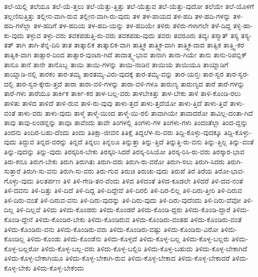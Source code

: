 {ತಲೆ-ಯಲ್ಲಿ
ತಲೆಯೂ
ತಲೆ-ಯೆ-ತ್ತಲು
ತಲೆ-ಯೆತ್ತು-ತ್ತಿತ್ತು
ತಲೆ-ಯೆತ್ತುವ
ತಲೆ-ಯೆತ್ತು-ವುದೋ
ತಲೆಯೇ
ತಲೆ-ಯೊಳಗೆ
ತಲ್ಲಣಿಸುತ್ತಿತ್ತು
ತಲ್ಲೀನ-ವಾಗಿ-ರುವ
ತಲ್ಲೀನ-ವಾಗಿ-ರು-ವುದು
ತಳ
ತಳ-ಪಾಯದ
ತಳ-ಹದಿ
ತಳ-ಹದಿ-ಗಳನ್ನು
ತಳ-ಹದಿ-ಗಳೆಲ್ಲಾ
ತಳ-ಹದಿಗೆ
ತಳ-ಹದಿಯ
ತಳ-ಹದಿ-ಯನ್ನು
ತಳ-ಹದಿಯೇ
ತಳಿರು
ತಳಿರು-ಗಳಾಗಲೇ
ತಳೆ-ದಿದ್ದ
ತಳ್ಳಿ-ಹಾ-ಕು-ವುದು
ತಳ್ಳುವ
ತಳ್ಳು-ವರು
ತವಕಪಡುತ್ತಿ-ರು-ವರು
ತವಕಪಡು-ವುದು
ತವರು
ತವರೂರು
ತವ್ಯಃ
ತಸ್ಮಾತ್
ತಸ್ಯ
ತಸ್ಯ-ತತ್
ತಾಗಿ
ತಾಗಿ-ತೆನ್ನ-ದಿರಿ
ತಾತ
ತಾತ್ಕಾಲಿಕ
ತಾತ್ಕಾಲಿಕ-ವಾಗಿ
ತಾತ್ತ್ವಿಕ
ತಾತ್ತ್ವಿಕ-ವಾಗಿ
ತಾತ್ತ್ವಿಕ-ವಾದ
ತಾತ್ವಿಕ
ತಾತ್ತ್ವಿ-ಕರ
ತಾತ್ವಿಕ-ವಾಗಿ
ತಾತ್ಸಾರ-ದಿಂದ
ತಾತ್ಸಾರ-ವುಂಟಾ-ಗಿದೆ
ತಾದಾತ್ಮ್ಯ-ಭಾವ
ತಾನಾಗಿ
ತಾನಾ-ಗಿಯೇ
ತಾನು
ತಾನು-ರಿಪಬ್ಲಿಕ್
ತಾನೂ
ತಾನೆ
ತಾನೇ
ತಾನೊಬ್ಬ
ತಾಯಿ
ತಾಯಿ-ಗಳನ್ನು
ತಾಯಿ-ನಾಡಿನ
ತಾಯಿಯ
ತಾಯಿಯೂ
ತಾಯ್ನಾಡಿಗೆ
ತಾಯ್ನಾಡಿ-ನಲ್ಲಿ
ತಾರಕಂ
ತಾರ-ತಮ್ಯ
ತಾರತಮ್ಯ-ವಿರು-ವುದಕ್ಕೆ
ತಾರ-ತಮ್ಯ-ವನ್ನು
ತಾರ-ಯನ್ತಃ
ತಾರ-ಸ್ವರ
ತಾರ-ಸ್ವರ-ದಲ್ಲಿ
ತಾರ-ಸ್ವರ-ಕ್ಕೇರು-ತ್ತದೆ
ತಾರಾ
ತಾರಾ-ವಳಿ-ಗಳನ್ನು
ತಾರಾ-ವಳಿ-ಗಳೂ
ತಾರುಣ್ಯ
ತಾರುಣ್ಯದ
ತಾರೆ
ತಾರೆ-ಗಳನ್ನು
ತಾರೆ-ಗಳು
ತಾರೆಯೂ
ತಾರ್ಕಿಕ
ತಾರ್ಕಿ-ಕರ
ತಾಳ-ಬಲ್ಲ-ವರು
ತಾಳಬೇಕಿತ್ತು
ತಾಳ-ಬೇಕು
ತಾಳಿ
ತಾಳಿ-ಕೊಂಡಿ-ರಲು
ತಾಳಿತು
ತಾಳಿದ
ತಾಳಿದೆ
ತಾಳಿ-ರುವ
ತಾಳಿ-ರು-ವುವು
ತಾಳು-ತ್ತದೆ
ತಾಳು-ತ್ತದೆಯೋ
ತಾಳು-ತ್ತಿದೆ
ತಾಳು-ತ್ತಿವೆ
ತಾಳು-ವಂತೆ
ತಾಳು-ವರು
ತಾಳು-ವುದು
ತಾಳ್ಮೆ
ತಾಳ್ಮೆ-ಯಿಂದ
ತಾಳ್ಮೆ-ಯಿ-ರಲಿ
ತಾವಾಗಿಯೇ
ತಾವಾದರೋ
ತಾವಿಲ್ಲ-ದಂತಾ-ಗಿದೆ
ತಾವು
ತಾವು-ಲಂಡನ್ನನ್ನು
ತಾವೂ
ತಾವೆಂದು
ತಾವೇ
ತಿಂಗಳಲ್ಲಿ
ತಿಂಗಳು-ಗಳ
ತಿಂಗಳು-ಗಳು
ತಿಂದಂತೆಲ್ಲಾ
ತಿಂದ-ದ್ದನ್ನು
ತಿಂದನು
ತಿಂದಿರ-ಬಹು-ದೆಂದು
ತಿಂದು
ತಿತಿಕ್ಷಾ-ಜೀವನ
ತಿತಿಕ್ಷೆ
ತಿದ್ದಲೆಳ-ಸು-ವರು
ತಿದ್ದಿ-ಕೊಳ್ಳು-ವುದಕ್ಕೂ
ತಿದ್ದಿ-ಕೊಳ್ಳು-ವುದು
ತಿದ್ದುವ
ತಿನ್ನದ-ವರನ್ನು
ತಿನ್ನದೆ
ತಿನ್ನಲು
ತಿನ್ನಲೂ
ತಿನ್ನುತ್ತಾ
ತಿನ್ನು-ತ್ತಿದೆ
ತಿನ್ನುತ್ತಿ-ರು-ವನು
ತಿನ್ನು-ತ್ತಿಲ್ಲ
ತಿನ್ನು-ವಂತೆ
ತಿನ್ನು-ವುದನ್ನು
ತಿನ್ನು-ವುದು
ತಿರಸ್ಕರಿಸ-ಬೇಕು
ತಿರಸ್ಕರಿ-ಸಿದರೆ
ತಿರಸ್ಕ-ರಿಸಿಯೋ
ತಿರಸ್ಕ-ರಿಸಿ-ರು-ವರು
ತಿರಸ್ಕಾರ-ಭಾವ
ತಿರು-ಕನೂ
ತಿರುಗ-ಬೇಕು
ತಿರುಗಿ
ತಿರುಗಿತು
ತಿರುಗಿ-ದರು
ತಿರುಗಿ-ರು-ವರೋ
ತಿರುಗಿ-ಸಲು
ತಿರುಗಿ-ಸಿದರು
ತಿರುಗಿ-ಸುತ್ತಾರೆ
ತಿರುಗಿ-ಸು-ವನು
ತಿರುಗಿ-ಸು-ವರು
ತಿರು-ಗುವ
ತಿರುಚಿ
ತಿರುಚು-ವುದು
ತಿರುಪೆ
ತಿರೆ
ತಿರೆಯ
ತಿರೋ-ಭಾವ-ಗೊಳ್ಳು-ವುದು
ತಿಲತರ್ಪಣ
ತಿಳಿ
ತಿಳಿ-ಗೇಡಿ-ತನ-ವೆಂದು
ತಿಳಿದ
ತಿಳಿದಂತೆ
ತಿಳಿದ-ಕೂಡಲೇ
ತಿಳಿದರೆ
ತಿಳಿ-ದವ-ನಂತೆ
ತಿಳಿ-ದವನು
ತಿಳಿ-ದಿತ್ತು
ತಿಳಿ-ದಿದೆ
ತಿಳಿ-ದಿದ್ದ
ತಿಳಿ-ದಿದ್ದೇವೆ
ತಿಳಿ-ದಿರಲಿ
ತಿಳಿ-ದಿರ-ಲಿಲ್ಲ
ತಿಳಿ-ದಿರು-ತ್ತೀರಿ
ತಿಳಿ-ದಿರುವ
ತಿಳಿ-ದಿರು-ವಂತೆ
ತಿಳಿ-ದಿರುವ-ವನು
ತಿಳಿ-ದಿರು-ವುದನ್ನು
ತಿಳಿ-ದಿರು-ವುದು
ತಿಳಿ-ದಿರು-ವುದೆಂದು
ತಿಳಿ-ದಿರು-ವೆವೋ
ತಿಳಿ-ದಿಲ್ಲ
ತಿಳಿ-ದಿಲ್ಲವೆ
ತಿಳಿದು
ತಿಳಿದು-ಕೊಂಡರು
ತಿಳಿದು-ಕೊಂಡರೆ
ತಿಳಿದು-ಕೊಂಡಿ-ದ್ದರು
ತಿಳಿದು-ಕೊಂಡಿ-ದ್ದಾರೆ
ತಿಳಿದು-ಕೊಂಡಿ-ದ್ದೇನೆ
ತಿಳಿದು-ಕೊಂಡಿರ-ಬೇಕು
ತಿಳಿದು-ಕೊಂಡಿರುವ
ತಿಳಿದು-ಕೊಂಡಿರು-ವಂತಹ
ತಿಳಿದು-ಕೊಂಡಿರು-ವಂತೆ
ತಿಳಿದು-ಕೊಂಡಿರು-ವನು
ತಿಳಿದು-ಕೊಂಡಿರು-ವರು
ತಿಳಿದು-ಕೊಂಡಿರು-ವಷ್ಟು
ತಿಳಿದು-ಕೊಂಡಿರು-ವಿರೋ
ತಿಳಿದು-ಕೊಂಡಿಲ್ಲ
ತಿಳಿದು-ಕೊಂಡು
ತಿಳಿದು-ಕೊಂಡೆನು
ತಿಳಿದು-ಕೊಳ್ಳದೆ
ತಿಳಿದು-ಕೊಳ್ಳ-ಬಲ್ಲ
ತಿಳಿದು-ಕೊಳ್ಳ-ಬಲ್ಲರು
ತಿಳಿದು-ಕೊಳ್ಳ-ಬಲ್ಲರೋ
ತಿಳಿದು-ಕೊಳ್ಳ-ಬಲ್ಲ-ವರು
ತಿಳಿದು-ಕೊಳ್ಳ-ಬಲ್ಲಿರಿ
ತಿಳಿದು-ಕೊಳ್ಳ-ಬಹುದು
ತಿಳಿದು-ಕೊಳ್ಳ-ಬೇಕಾಗಿದೆ
ತಿಳಿದು-ಕೊಳ್ಳ-ಬೇಕಾಗಿಯೂ
ತಿಳಿದು-ಕೊಳ್ಳ-ಬೇಕಾಗಿ-ರುವ
ತಿಳಿದು-ಕೊಳ್ಳ-ಬೇಕಾದ
ತಿಳಿದು-ಕೊಳ್ಳ-ಬೇಕಾದರೆ
ತಿಳಿದು-ಕೊಳ್ಳ-ಬೇಕು
ತಿಳಿದು-ಕೊಳ್ಳ-ಬೇಕೆಂದು
}
